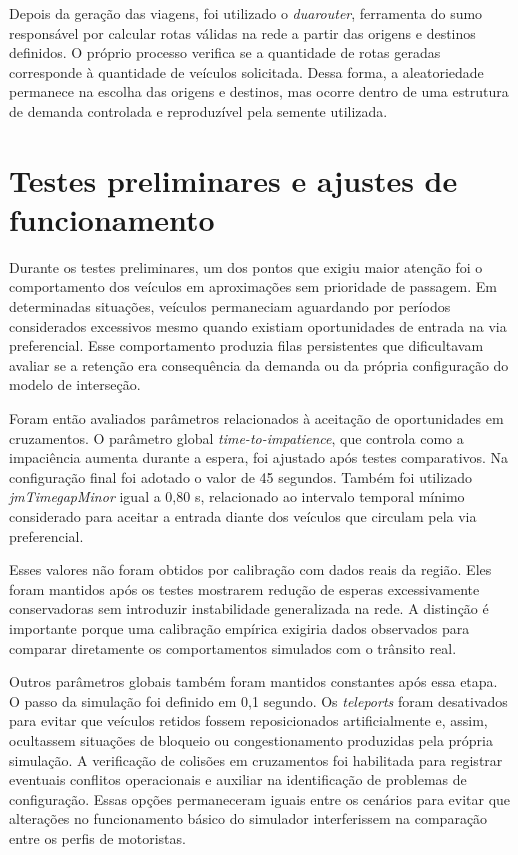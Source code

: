 Depois da geração das viagens, foi utilizado o \textit{duarouter}, ferramenta do \gls{sumo} responsável por calcular rotas válidas na rede a partir das origens e destinos definidos. O próprio processo verifica se a quantidade de rotas geradas corresponde à quantidade de veículos solicitada. Dessa forma, a aleatoriedade permanece na escolha das origens e destinos, mas ocorre dentro de uma estrutura de demanda controlada e reproduzível pela semente utilizada.

\section{Testes preliminares e ajustes de funcionamento}

Durante os testes preliminares, um dos pontos que exigiu maior atenção foi o comportamento dos veículos em aproximações sem prioridade de passagem. Em determinadas situações, veículos permaneciam aguardando por períodos considerados excessivos mesmo quando existiam oportunidades de entrada na via preferencial. Esse comportamento produzia filas persistentes que dificultavam avaliar se a retenção era consequência da demanda ou da própria configuração do modelo de interseção.

Foram então avaliados parâmetros relacionados à aceitação de oportunidades em cruzamentos. O parâmetro global \textit{time-to-impatience}, que controla como a impaciência aumenta durante a espera, foi ajustado após testes comparativos. Na configuração final foi adotado o valor de 45 segundos. Também foi utilizado \textit{jmTimegapMinor} igual a 0,80 s, relacionado ao intervalo temporal mínimo considerado para aceitar a entrada diante dos veículos que circulam pela via preferencial.

Esses valores não foram obtidos por calibração com dados reais da região. Eles foram mantidos após os testes mostrarem redução de esperas excessivamente conservadoras sem introduzir instabilidade generalizada na rede. A distinção é importante porque uma calibração empírica exigiria dados observados para comparar diretamente os comportamentos simulados com o trânsito real.

Outros parâmetros globais também foram mantidos constantes após essa etapa. O passo da simulação foi definido em 0,1 segundo. Os \textit{teleports} foram desativados para evitar que veículos retidos fossem reposicionados artificialmente e, assim, ocultassem situações de bloqueio ou congestionamento produzidas pela própria simulação. A verificação de colisões em cruzamentos foi habilitada para registrar eventuais conflitos operacionais e auxiliar na identificação de problemas de configuração. Essas opções permaneceram iguais entre os cenários para evitar que alterações no funcionamento básico do simulador interferissem na comparação entre os perfis de motoristas.

